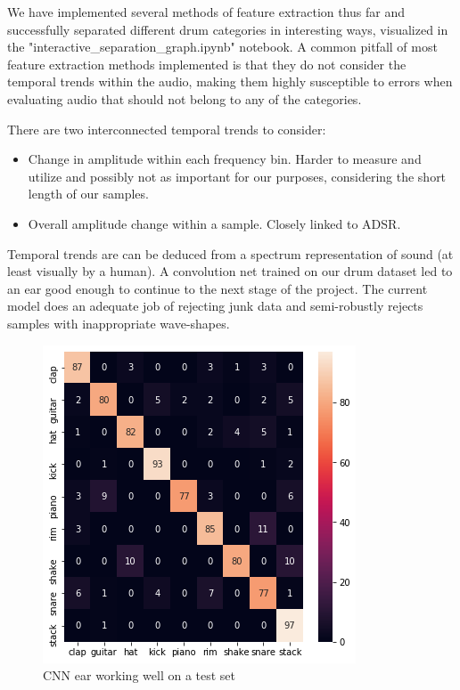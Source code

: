 \documentclass{nime-alternate} %
\begin{document}
We have implemented several methods of feature extraction thus far and successfully separated different drum categories in interesting ways, visualized in the "interactive\_separation\_graph.ipynb" notebook. A common pitfall of most feature extraction methods implemented is that they do not consider the temporal trends within the audio, making them highly susceptible to errors when evaluating audio that should not belong to any of the categories.\\

There are two interconnected temporal trends to consider: 
\begin{itemize}
    \item Change in amplitude within each frequency bin. Harder to measure and utilize and possibly not as important for our purposes, considering the short length of our samples.
    \item Overall amplitude change within a sample. Closely linked to ADSR. 
\end{itemize}{}

Temporal trends are can be deduced from a spectrum representation of sound (at least visually by a human). A convolution net trained on our drum dataset led to an ear good enough to continue to the next stage of the project. The current model does an adequate job of rejecting junk data and semi-robustly rejects samples with inappropriate wave-shapes.
\begin{figure}[H]
\centering
\includegraphics[width=0.8\linewidth]{images/cnn_ear.png}
\caption{CNN ear working well on a test set}
\label{fig:ok ear}
\end{figure}
\end{document}
